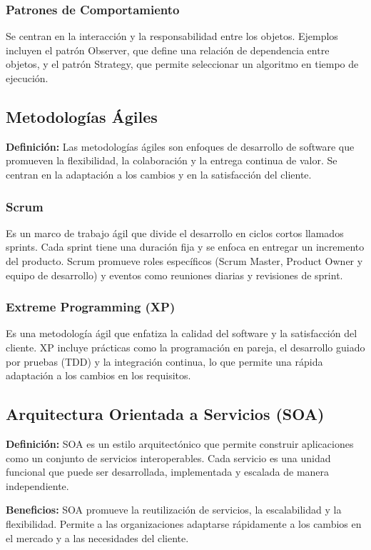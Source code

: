 \documentclass[twocolumn]{article}
\begin{document}
\subsubsection{Patrones de Comportamiento}
Se centran en la interacción y la responsabilidad entre los objetos. Ejemplos incluyen el patrón Observer, que define una relación de dependencia entre objetos, y el patrón Strategy, que permite seleccionar un algoritmo en tiempo de ejecución.

\subsection{Metodologías Ágiles}
\textbf{Definición:} Las metodologías ágiles son enfoques de desarrollo de software que promueven la flexibilidad, la colaboración y la entrega continua de valor. Se centran en la adaptación a los cambios y en la satisfacción del cliente.

\subsubsection{Scrum}
Es un marco de trabajo ágil que divide el desarrollo en ciclos cortos llamados sprints. Cada sprint tiene una duración fija y se enfoca en entregar un incremento del producto. Scrum promueve roles específicos (Scrum Master, Product Owner y equipo de desarrollo) y eventos como reuniones diarias y revisiones de sprint.

\subsubsection{Extreme Programming (XP)}
Es una metodología ágil que enfatiza la calidad del software y la satisfacción del cliente. XP incluye prácticas como la programación en pareja, el desarrollo guiado por pruebas (TDD) y la integración continua, lo que permite una rápida adaptación a los cambios en los requisitos.

\subsection{Arquitectura Orientada a Servicios (SOA)}
\textbf{Definición:} SOA es un estilo arquitectónico que permite construir aplicaciones como un conjunto de servicios interoperables. Cada servicio es una unidad funcional que puede ser desarrollada, implementada y escalada de manera independiente.

\textbf{Beneficios:} SOA promueve la reutilización de servicios, la escalabilidad y la flexibilidad. Permite a las organizaciones adaptarse rápidamente a los cambios en el mercado y a las necesidades del cliente.
\end{document}
